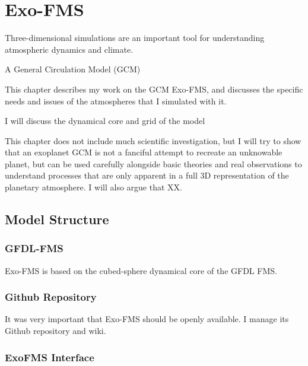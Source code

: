 \newpage
\appendix

\chapter{Exo-FMS}\label{ap:exo-fms}



Three-dimensional simulations are an important tool for understanding atmospheric dynamics and climate.

A General Circulation Model (GCM)


This chapter describes my work on the GCM Exo-FMS, and discusses the specific needs and issues of the atmospheres that I simulated with it.

I will discuss the dynamical core and grid of the model

This chapter does not include much scientific investigation, but I will try to show that an exoplanet GCM is not a fanciful attempt to recreate an unknowable planet, but can be used carefully alongside basic theories and real observations to understand processes that are only apparent in a full 3D representation of the planetary atmosphere. I will also argue that XX.

\section{Model Structure}

\subsection*{GFDL-FMS}

Exo-FMS is based on the cubed-sphere dynamical core of the GFDL FMS.


\subsection*{Github Repository}

It was very important that Exo-FMS should be openly available. I manage its Github repository and wiki.


\subsection*{ExoFMS Interface}

